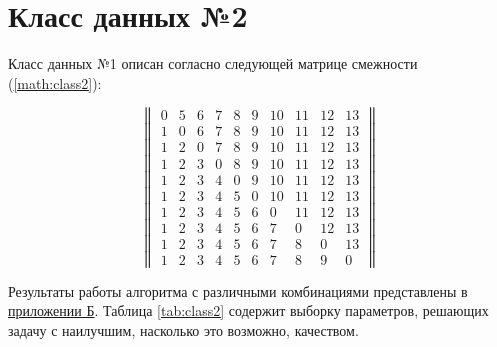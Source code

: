 \section{Класс данных №2}

Класс данных №1 описан согласно следующей матрице смежности (\ref{math:class2}): 

\begin{equation}\label{math:class2}
    \begin{Vmatrix}
        0 & 5 & 6 & 7 & 8 & 9 & 10 & 11 & 12 & 13 \\
        1 & 0 & 6 & 7 & 8 & 9 & 10 & 11 & 12 & 13 \\
        1 & 2 & 0 & 7 & 8 & 9 & 10 & 11 & 12 & 13 \\
        1 & 2 & 3 & 0 & 8 & 9 & 10 & 11 & 12 & 13 \\
        1 & 2 & 3 & 4 & 0 & 9 & 10 & 11 & 12 & 13 \\
        1 & 2 & 3 & 4 & 5 & 0 & 10 & 11 & 12 & 13 \\
        1 & 2 & 3 & 4 & 5 & 6 & 0 & 11 & 12 & 13 \\
        1 & 2 & 3 & 4 & 5 & 6 & 7 & 0 & 12 & 13 \\
        1 & 2 & 3 & 4 & 5 & 6 & 7 & 8 & 0 & 13 \\
        1 & 2 & 3 & 4 & 5 & 6 & 7 & 8 & 9 & 0 
    \end{Vmatrix}
\end{equation}

Результаты работы алгоритма с различными комбинациями представлены в \hyperref[sec:fig2]{приложении Б}. Таблица \ref{tab:class2} содержит выборку параметров, решающих задачу с наилучшим, насколько это возможно, качеством.

